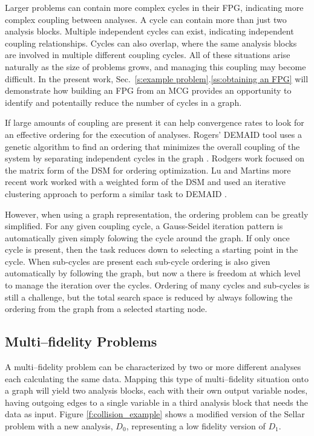 	Larger problems can contain more complex cycles in their FPG, indicating more 
	complex coupling between analyses. A cycle can contain more than 
	just two analysis blocks. Multiple independent cycles can exist, indicating 
	independent coupling relationships. Cycles can also overlap, where the same analysis 
	blocks are involved in multiple different coupling cycles. All of these situations
	arise naturally as the size of problems grows, and managing this coupling may
	become difficult. In the present work, Sec.~\ref{s:example problem}.\ref{ss:obtaining an FPG} 
  will demonstrate how building an FPG from an MCG provides an opportunity to 
  identify and potentailly reduce the number of cycles in a graph. 

  If large amounts of coupling are present it can help convergence 
  rates to look for an effective ordering for the execution of analyses.
  Rogers' DEMAID tool uses a genetic algorithm to find an ordering that minimizes 
  the overall coupling of the system by separating independent cycles in the 
  graph \cite{rogers1996,rogers1996demaid}. Rodgers work focused on the matrix 
  form of the DSM for ordering optimization. Lu and Martins more recent work 
  worked with a weighted form of the DSM and used an iterative clustering approach 
  to perform a similar task to DEMAID \cite{Lu2012}. 

  However, when using a graph representation, the ordering problem can be greatly 
  simplified. For any given coupling cycle, a Gauss-Seidel iteration pattern 
  is automatically given simply folowing the cycle around the graph. If only 
  once cycle is present, then the task reduces down to selecting a starting point
  in the cycle. When sub-cycles are present each sub-cycle ordering is also 
  given automatically by following the graph, but now a there is freedom at which 
  level to manage the iteration over the cycles. Ordering of many cycles and 
  sub-cycles is still a challenge, but the total search space is reduced by 
  always following the ordering from the graph from a selected starting node. 

\subsection{Multi--fidelity Problems}
	\label{ss:multi-fideliy problems}
	A multi--fidelity problem can be characterized by two or more different analyses 
	each calculating the same data. Mapping this type of multi--fidelity situation 
	onto a graph will yield two analysis blocks, each with their own output 
	variable nodes, having outgoing edges to a single variable in a third analysis 
  block that needs the data as input. Figure \ref{f:collision_example} shows 
  a modified version of the Sellar problem with a new analysis, $D_0$, representing a 
  low fidelity version of $D_1$. 

